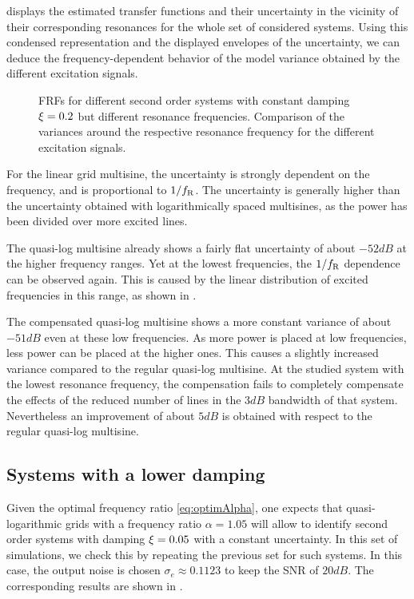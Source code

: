    displays the estimated transfer functions and their uncertainty in the vicinity of their corresponding resonances for the whole set of considered systems.
  Using this condensed representation and the displayed envelopes of the uncertainty, we can deduce the frequency-dependent behavior of the model variance obtained by the different excitation signals.

  \begin{figure}%
    \centering
    \setlength\figureheight{5cm}
    \setlength{}
    
    \caption[Simulated FRFs and their variances of systems with $\damping=0.2$ for different excitation signals.]{FRFs for different second order systems with constant damping
             $\damping=0.2$ but different resonance frequencies. Comparison of the
             variances around the respective resonance frequency for the different
             excitation signals.}%
    \label{fig:damping02}
  \end{figure}

  For the linear grid multisine, the uncertainty is strongly dependent on the frequency, and is proportional to $1/f_{\mathrm{R}}$.
  The uncertainty is generally higher than the uncertainty obtained with logarithmically spaced multisines, as the power has been divided over more excited lines.

  The quasi-log multisine already shows a fairly flat uncertainty of about $-52 \unit{dB}$ at the higher frequency ranges.
  Yet at the lowest frequencies, the $1/f_{\mathrm{R}}$ dependence can be observed again.
  This is caused by the linear distribution of excited frequencies in this range, as shown in .

  The compensated quasi-log multisine shows a more constant variance of about $-51 \unit{dB}$ even at these low frequencies.
  As more power is placed at low frequencies, less power can be placed at the higher ones.
  This causes a slightly increased variance compared to the regular quasi-log multisine.
  At the studied system with the lowest resonance frequency, the compensation fails to completely compensate the effects of the reduced number of lines in the $3\unit{dB}$ bandwidth of that system.
  Nevertheless an improvement of about $5\unit{dB}$ is obtained with respect to the regular quasi-log multisine.

  \subsection{Systems with a lower damping}
  Given the optimal frequency ratio \eqref{eq:optimAlpha}, one expects that quasi-logarithmic grids with a frequency ratio $\alpha = 1.05$ will allow to identify second order systems with damping $\xi = 0.05$ with a constant uncertainty.
  In this set of simulations, we check this by repeating the previous set for such systems.
  In this case, the output noise is chosen $\sigma_e \approx 0.1123$ to keep the SNR of $20\unit{dB}$.
  The corresponding results are shown in .
 
